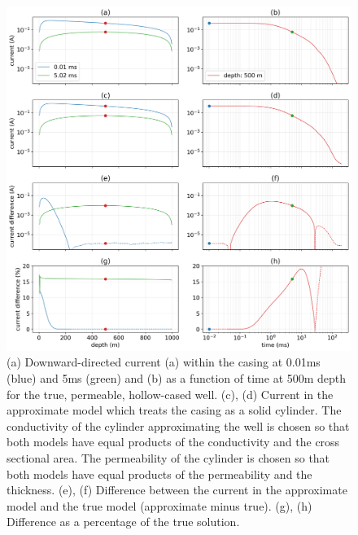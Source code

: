 \begin{figure}
    \begin{center}
    \includegraphics[width=\textwidth]{figures/em_casing/approx_permeable_currents.png}
    \end{center}
\caption{
    (a) Downward-directed current (a) within the casing at 0.01ms (blue) and 5ms (green)
    and (b) as a function of time at 500m depth for the true, permeable, hollow-cased well.
    (c), (d) Current in the approximate model which treats the casing as a solid cylinder.
    The conductivity of the cylinder approximating the well is chosen so that both models have
    equal products of the conductivity and the cross sectional area.
    The permeability of the cylinder is chosen so that both models have equal products of the
    permeability and the thickness.
    (e), (f) Difference between the current in the approximate model and the true model (approximate minus true).
    (g), (h) Difference as a percentage of the true solution.
}
\label{fig:approx_permeable_currents}
\end{figure}



